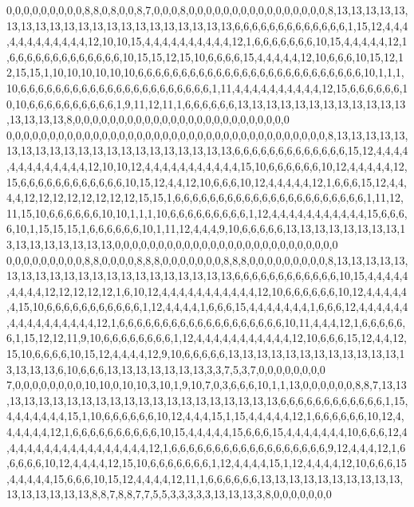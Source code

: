 0,0,0,0,0,0,0,0,0,8,8,0,8,0,0,8,7,0,0,0,8,0,0,0,0,0,0,0,0,0,0,0,0,0,0,0,0,8,13,13,13,13,13,13,13,13,13,13,13,13,13,13,13,13,13,13,13,13,13,6,6,6,6,6,6,6,6,6,6,6,6,6,1,15,12,4,4,4,4,4,4,4,4,4,4,4,4,12,10,10,15,4,4,4,4,4,4,4,4,4,4,12,1,6,6,6,6,6,6,6,10,15,4,4,4,4,4,12,1,6,6,6,6,6,6,6,6,6,6,6,6,6,10,15,15,12,15,10,6,6,6,6,15,4,4,4,4,4,12,10,6,6,6,10,15,12,12,15,15,1,10,10,10,10,10,10,6,6,6,6,6,6,6,6,6,6,6,6,6,6,6,6,6,6,6,6,6,6,6,6,6,6,10,1,1,1,10,6,6,6,6,6,6,6,6,6,6,6,6,6,6,6,6,6,6,6,6,6,6,1,11,4,4,4,4,4,4,4,4,4,4,12,15,6,6,6,6,6,6,10,10,6,6,6,6,6,6,6,6,6,6,1,9,11,12,11,1,6,6,6,6,6,6,13,13,13,13,13,13,13,13,13,13,13,13,13,13,13,13,8,0,0,0,0,0,0,0,0,0,0,0,0,0,0,0,0,0,0,0,0,0,0,0,0,0
0,0,0,0,0,0,0,0,0,0,0,0,0,0,0,0,0,0,0,0,0,0,0,0,0,0,0,0,0,0,0,0,0,0,0,0,0,8,13,13,13,13,13,13,13,13,13,13,13,13,13,13,13,13,13,13,13,13,13,6,6,6,6,6,6,6,6,6,6,6,6,6,15,12,4,4,4,4,4,4,4,4,4,4,4,4,4,12,10,10,12,4,4,4,4,4,4,4,4,4,4,4,15,10,6,6,6,6,6,6,10,12,4,4,4,4,4,12,15,6,6,6,6,6,6,6,6,6,6,6,6,10,15,12,4,4,12,10,6,6,6,10,12,4,4,4,4,4,12,1,6,6,6,15,12,4,4,4,4,12,12,12,12,12,12,12,12,15,15,1,6,6,6,6,6,6,6,6,6,6,6,6,6,6,6,6,6,6,6,6,6,6,1,11,12,11,15,10,6,6,6,6,6,6,10,10,1,1,1,10,6,6,6,6,6,6,6,6,6,1,12,4,4,4,4,4,4,4,4,4,4,4,15,6,6,6,6,10,1,15,15,15,1,6,6,6,6,6,6,10,1,11,12,4,4,4,9,10,6,6,6,6,6,13,13,13,13,13,13,13,13,13,13,13,13,13,13,13,13,0,0,0,0,0,0,0,0,0,0,0,0,0,0,0,0,0,0,0,0,0,0,0,0,0,0
0,0,0,0,0,0,0,0,0,8,8,0,0,0,0,8,8,8,0,0,0,0,0,0,0,8,8,8,0,0,0,0,0,0,0,0,0,8,13,13,13,13,13,13,13,13,13,13,13,13,13,13,13,13,13,13,13,13,13,6,6,6,6,6,6,6,6,6,6,6,6,10,15,4,4,4,4,4,4,4,4,4,12,12,12,12,12,1,6,10,12,4,4,4,4,4,4,4,4,4,4,4,12,10,6,6,6,6,6,6,10,12,4,4,4,4,4,4,15,10,6,6,6,6,6,6,6,6,6,6,6,1,12,4,4,4,4,1,6,6,6,15,4,4,4,4,4,4,4,1,6,6,6,12,4,4,4,4,4,4,4,4,4,4,4,4,4,4,4,4,12,1,6,6,6,6,6,6,6,6,6,6,6,6,6,6,6,6,6,6,6,10,11,4,4,4,12,1,6,6,6,6,6,6,1,15,12,12,11,9,10,6,6,6,6,6,6,6,6,1,12,4,4,4,4,4,4,4,4,4,4,4,12,10,6,6,6,15,12,4,4,12,15,10,6,6,6,6,10,15,12,4,4,4,4,12,9,10,6,6,6,6,6,13,13,13,13,13,13,13,13,13,13,13,13,13,13,13,13,6,10,6,6,6,13,13,13,13,13,13,13,3,3,7,5,3,7,0,0,0,0,0,0,0,0
7,0,0,0,0,0,0,0,0,10,10,0,10,10,3,10,1,9,10,7,0,3,6,6,6,10,1,1,13,0,0,0,0,0,0,8,8,7,13,13,13,13,13,13,13,13,13,13,13,13,13,13,13,13,13,13,13,13,13,6,6,6,6,6,6,6,6,6,6,6,6,1,15,4,4,4,4,4,4,4,15,1,10,6,6,6,6,6,6,10,12,4,4,4,15,1,15,4,4,4,4,4,12,1,6,6,6,6,6,6,10,12,4,4,4,4,4,4,12,1,6,6,6,6,6,6,6,6,6,6,10,15,4,4,4,4,4,15,6,6,6,15,4,4,4,4,4,4,4,10,6,6,6,12,4,4,4,4,4,4,4,4,4,4,4,4,4,4,4,4,4,12,1,6,6,6,6,6,6,6,6,6,6,6,6,6,6,6,6,6,6,9,12,4,4,4,12,1,6,6,6,6,6,10,12,4,4,4,4,12,15,10,6,6,6,6,6,6,6,1,12,4,4,4,4,15,1,12,4,4,4,4,12,10,6,6,6,15,4,4,4,4,4,15,6,6,6,10,15,12,4,4,4,4,12,11,1,6,6,6,6,6,6,13,13,13,13,13,13,13,13,13,13,13,13,13,13,13,13,8,8,7,8,8,7,7,5,5,3,3,3,3,3,13,13,13,3,8,0,0,0,0,0,0,0
